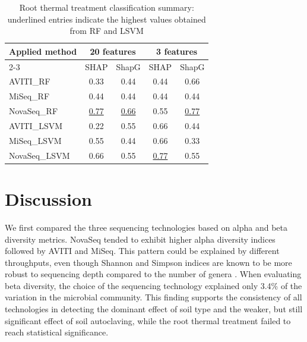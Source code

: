 \documentclass[12pt]{article}
\theoremstyle{thmstyleone}%
\theoremstyle{thmstyletwo}%
\theoremstyle{thmstylethree}%
\begin{document}
\begin{table}[htbp]
\caption{Root thermal treatment classification summary: underlined entries indicate the highest values obtained from RF and LSVM}\label{tab:model_performance3}%
\begin{tabular*}{\textwidth}{@{\extracolsep{\fill}}lcccc}
\toprule
\textbf{Applied method} & \multicolumn{2}{c}{\textbf{20 features}} & \multicolumn{2}{c}{\textbf{3 features}} \\
\cmidrule{2-3} \cmidrule{4-5}
& SHAP & ShapG & SHAP & ShapG \\
\midrule
AVITI\_RF & 0.33 & 0.44 & 0.44 & 0.66 \\
MiSeq\_RF & 0.44 & 0.44 & 0.44 & 0.44 \\
NovaSeq\_RF & \underline{0.77} & \underline{0.66} & 0.55 & \underline{0.77} \\
\midrule
AVITI\_LSVM & 0.22 & 0.55 & 0.66 & 0.44 \\
MiSeq\_LSVM & 0.55 & 0.44 & 0.66 & 0.33 \\
NovaSeq\_LSVM & 0.66 & 0.55 & \underline{0.77} & 0.55 \\
\hline
\end{tabular*}
\end{table}



\section{Discussion}
We first compared the three sequencing technologies based on alpha and beta diversity metrics. NovaSeq tended to exhibit higher alpha diversity indices followed by AVITI and MiSeq. This pattern could be explained by different throughputs, even though Shannon and Simpson indices are known to be more robust to sequencing depth compared to the number of genera \citep{alpha_div10.1093/femsec/fiae019}. When evaluating beta diversity, the choice of the sequencing technology explained only 3.4\% of the variation in the microbial community. This finding supports the consistency of all technologies in detecting the dominant effect of soil type and the weaker, but still significant effect of soil autoclaving, while the root thermal treatment failed to reach statistical significance.
\end{document}
